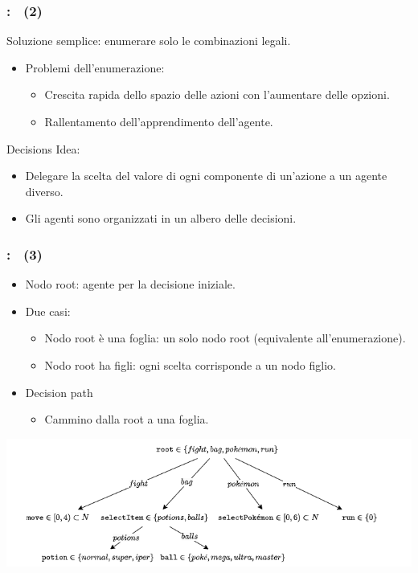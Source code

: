 \documentclass[compress]{beamer}
\begin{document}
\begin{frame}
    \frametitle{\subsecname: \subsubsecname\ (2)}
    Soluzione semplice: enumerare solo le combinazioni legali.
    \begin{itemize}
        \item Problemi dell'enumerazione:
        \begin{itemize}
            \item Crescita rapida dello spazio delle azioni con l'aumentare delle opzioni.
            \item Rallentamento dell'apprendimento dell'agente.
        \end{itemize}
    \end{itemize}
    \vspace{0.5cm}
    Decisions Idea:
    \begin{itemize}
        \item Delegare la scelta del valore di ogni componente di un'azione a un agente diverso.
        \item Gli agenti sono organizzati in un albero delle decisioni.
    \end{itemize}
\end{frame}

\begin{frame}
    \frametitle{\subsecname: \subsubsecname\ (3)}
    \begin{itemize}
        \item Nodo root: agente per la decisione iniziale.
        \item Due casi:
        \begin{itemize}
            \item Nodo root è una foglia: un solo nodo root (equivalente all'enumerazione).
            \item Nodo root ha figli: ogni scelta corrisponde a un nodo figlio.
        \end{itemize}
        \item Decision path
        \begin {itemize}
            \item Cammino dalla root a una foglia.
        \end{itemize}
    \end{itemize}
    \begin{adjustbox}{margin=0cm 0cm 0cm 0.5cm, center} %
        \includegraphics[width=.8\textwidth]{figs/decisions.drawio.png}
    \end{adjustbox}
\end{frame}
\end{document}
